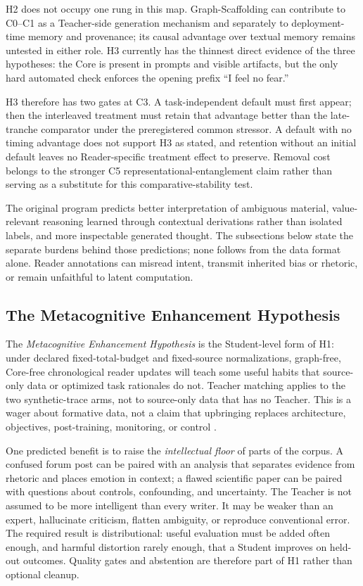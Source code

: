 \documentclass[11pt]{article}
\begin{document}
H2 does not occupy one rung in this map. Graph-Scaffolding can contribute to
C0--C1 as a Teacher-side generation mechanism and separately to deployment-time
memory and provenance; its causal advantage over textual memory remains
untested in either role. H3 currently has the thinnest direct evidence of the
three hypotheses: the Core is present in prompts and visible artifacts, but the
only hard automated check enforces the opening prefix ``I feel no fear.''

H3 therefore has two gates at C3. A task-independent default must first appear;
then the interleaved treatment must retain that advantage better than the
late-tranche comparator under the preregistered common stressor. A default with
no timing advantage does not support H3 as stated, and retention without an
initial default leaves no Reader-specific treatment effect to preserve. Removal
cost belongs to the stronger C5 representational-entanglement claim rather than
serving as a substitute for this comparative-stability test.

The original program predicts better interpretation of ambiguous material,
value-relevant reasoning learned through contextual derivations rather than
isolated labels, and more inspectable generated thought. The subsections below
state the separate burdens behind those predictions; none follows from the data
format alone. Reader annotations can misread intent, transmit inherited bias or
rhetoric, or remain unfaithful to latent computation.

\subsection{The Metacognitive Enhancement Hypothesis}\label{sec:meh}

The \emph{Metacognitive Enhancement Hypothesis} is the Student-level form of H1: under declared fixed-total-budget and fixed-source normalizations, graph-free, Core-free chronological reader updates will teach some useful habits that source-only data or optimized task rationales do not. Teacher matching applies to the two synthetic-trace arms, not to source-only data that has no Teacher. This is a wager about formative data, not a claim that upbringing replaces architecture, objectives, post-training, monitoring, or control \cite{nye2021scratchpads,zelikman2024quietstar}.

One predicted benefit is to raise the \emph{intellectual floor} of parts of the corpus. A confused forum post can be paired with an analysis that separates evidence from rhetoric and places emotion in context; a flawed scientific paper can be paired with questions about controls, confounding, and uncertainty. The Teacher is not assumed to be more intelligent than every writer. It may be weaker than an expert, hallucinate criticism, flatten ambiguity, or reproduce conventional error. The required result is distributional: useful evaluation must be added often enough, and harmful distortion rarely enough, that a Student improves on held-out outcomes. Quality gates and abstention are therefore part of H1 rather than optional cleanup.
\end{document}
